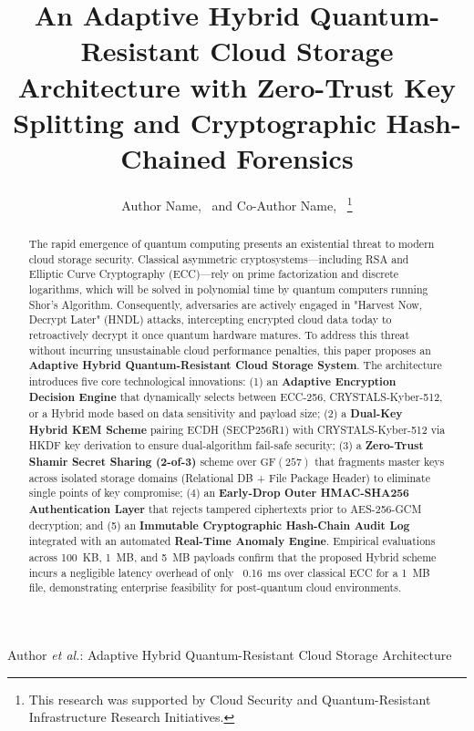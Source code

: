 \documentclass[journal,twoside]{IEEEtran}
\begin{document}
\title{An Adaptive Hybrid Quantum-Resistant Cloud Storage Architecture with Zero-Trust Key Splitting and Cryptographic Hash-Chained Forensics}

\author{Author Name,~ and Co-Author Name,~%
\thanks{This research was supported by Cloud Security and Quantum-Resistant Infrastructure Research Initiatives.}}

%
{Author \MakeLowercase{\textit{et al.}}: Adaptive Hybrid Quantum-Resistant Cloud Storage Architecture}

\maketitle

\begin{abstract}
The rapid emergence of quantum computing presents an existential threat to modern cloud storage security. Classical asymmetric cryptosystems—including RSA and Elliptic Curve Cryptography (ECC)—rely on prime factorization and discrete logarithms, which will be solved in polynomial time by quantum computers running Shor's Algorithm. Consequently, adversaries are actively engaged in "Harvest Now, Decrypt Later" (HNDL) attacks, intercepting encrypted cloud data today to retroactively decrypt it once quantum hardware matures. To address this threat without incurring unsustainable cloud performance penalties, this paper proposes an \textbf{Adaptive Hybrid Quantum-Resistant Cloud Storage System}. The architecture introduces five core technological innovations: (1) an \textbf{Adaptive Encryption Decision Engine} that dynamically selects between ECC-256, CRYSTALS-Kyber-512, or a Hybrid mode based on data sensitivity and payload size; (2) a \textbf{Dual-Key Hybrid KEM Scheme} pairing ECDH (SECP256R1) with CRYSTALS-Kyber-512 via HKDF key derivation to ensure dual-algorithm fail-safe security; (3) a \textbf{Zero-Trust Shamir Secret Sharing (2-of-3)} scheme over $\text{GF}(257)$ that fragments master keys across isolated storage domains (Relational DB + File Package Header) to eliminate single points of key compromise; (4) an \textbf{Early-Drop Outer HMAC-SHA256 Authentication Layer} that rejects tampered ciphertexts prior to AES-256-GCM decryption; and (5) an \textbf{Immutable Cryptographic Hash-Chain Audit Log} integrated with an automated \textbf{Real-Time Anomaly Engine}. Empirical evaluations across 100~KB, 1~MB, and 5~MB payloads confirm that the proposed Hybrid scheme incurs a negligible latency overhead of only ~0.16~ms over classical ECC for a 1~MB file, demonstrating enterprise feasibility for post-quantum cloud environments.
\end{abstract}
\end{document}
